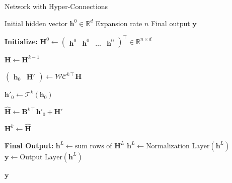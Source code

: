 \begin{algorithm}[h]
\caption{Network with Hyper-Connections}\label{alg:hyper_connections}
\begin{algorithmic}[1]
\Require Initial hidden vector $\mathbf{h}^0 \in \mathbb{R}^d$
\Require Expansion rate $n$
\Ensure Final output $\mathbf{y}$

\State \textbf{Initialize:}
\State $\mathbf{H}^0 \gets \begin{pmatrix} \mathbf{h}^0 & \mathbf{h}^0 & \dots & \mathbf{h}^0 \end{pmatrix}^\intercal \in \mathbb{R}^{n\times d}$

 
    \State $\mathbf{H} \gets \mathbf{H}^{k-1}$
    
    \State $\begin{pmatrix} \mathbf{h}_0 & \mathbf{H'} \end{pmatrix} \gets \mathcal{WC}^{k\intercal} \mathbf{H}$ 
    
    \State $\mathbf{h}'_0 \gets \mathcal{T}^k(\mathbf{h}_0)$ 
    
    \State $\mathbf{\hat{H}} \gets \mathbf{B}^{k\intercal} \mathbf{h}'_0 + \mathbf{H'}$ 
    
    \State $\mathbf{H}^k \gets \mathbf{\hat{H}}$
\EndFor

\State \textbf{Final Output:}
\State $\mathbf{h}^L \gets \text{sum rows of } \mathbf{H}^L$
\State $\mathbf{h}^L \gets \text{Normalization Layer}(\mathbf{h}^L)$
\State $\mathbf{y} \gets \text{Output Layer}(\mathbf{h}^L)$

\State \Return $\mathbf{y}$
\end{algorithmic}
\end{algorithm}

\label{app:pytorch}

\newpage

